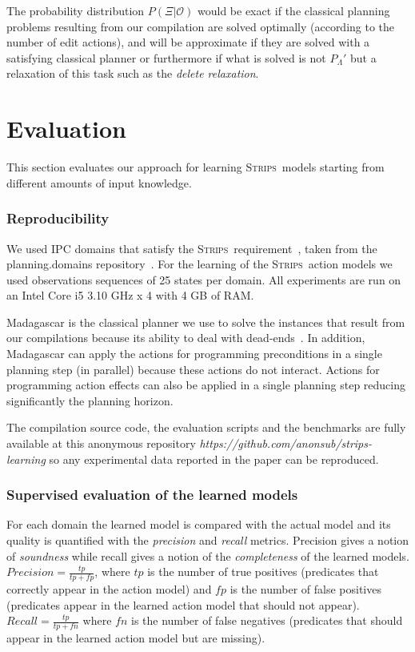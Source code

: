 \documentclass{article}
\newcommand{\strips}{\textsc{Strips}}     %
\begin{document}
The probability distribution $P(\Xi|\mathcal{O})$ would be exact if the classical planning problems resulting from our compilation are solved optimally (according to the number of edit actions), and will be approximate if they are solved with a satisfying classical planner or furthermore if what is solved is not $P_{\Lambda}'$ but a relaxation of this task such as the {\em delete relaxation}.


\section{Evaluation}
This section evaluates our approach for learning \strips\ models starting from different amounts of input knowledge.

\subsubsection{Reproducibility}
We used IPC domains that satisfy the \strips\ requirement~\cite{fox2003pddl2}, taken from the {\sc planning.domains} repository~\cite{muise2016planning}. For the learning of the \strips\ action models we used observations sequences of 25 states per domain. All experiments are run on an Intel Core i5 3.10 GHz x 4 with 4 GB of RAM.

{\sc Madagascar} is the classical planner we use to solve the instances that result from our compilations because its ability to deal with dead-ends~\cite{rintanen2014madagascar}. In addition, {\sc Madagascar} can apply the actions for programming preconditions in a single planning step (in parallel) because these actions do not interact. Actions for programming action effects can also be applied in a single planning step reducing significantly the planning horizon.

The compilation source code, the evaluation scripts and the benchmarks are fully available at this anonymous repository {\em https://github.com/anonsub/strips-learning} so any experimental data reported in the paper can be reproduced. 

\subsubsection{Supervised evaluation of the learned models}
For each domain the learned model is compared with the actual model and its quality is quantified with the {\em precision} and {\em recall} metrics. Precision gives a notion of {\em soundness} while recall gives a notion of the {\em completeness} of the learned models. $Precision=\frac{tp}{tp+fp}$, where $tp$ is the number of true positives (predicates that correctly appear in the action model) and $fp$ is the number of false positives (predicates appear in the learned action model that should not appear). $Recall=\frac{tp}{tp+fn}$ where $fn$ is the number of false negatives (predicates that should appear in the learned action model but are missing).
\end{document}
